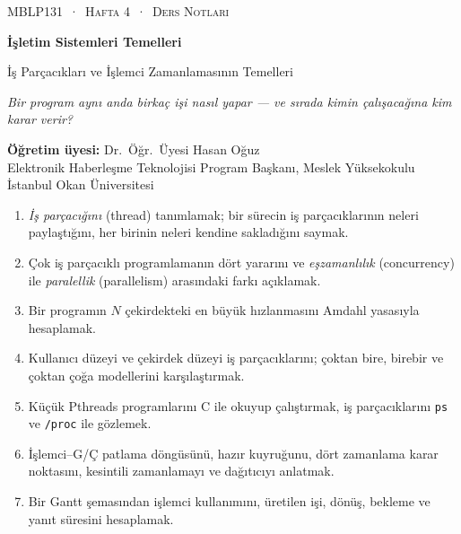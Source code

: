 \documentclass[11pt,a4paper]{article}
\newcommand{\cmd}[1]{\texttt{#1}}
\begin{document}
\thispagestyle{empty}
\begin{tcolorbox}[enhanced,colback=dark,colframe=dark,arc=0pt,boxrule=0pt,
  left=18pt,right=18pt,top=20pt,bottom=20pt,coltext=white]
{\small\color{mint}\textsc{MBLP131 \,·\, Hafta 4 \,·\, Ders Notları}}\par\medskip
{\headfont\fontsize{26}{30}\selectfont\bfseries İşletim Sistemleri Temelleri}\par\medskip
{\large İş Parçacıkları ve İşlemci Zamanlamasının Temelleri}\par\smallskip
{\small\itshape\color{white!70} Bir program aynı anda birkaç işi nasıl yapar --- ve sırada kimin çalışacağına kim karar verir?}
\end{tcolorbox}

\vspace{0.4em}
\begin{minipage}[t]{0.70\linewidth}
\small
\textbf{Öğretim üyesi:} Dr.\ Öğr.\ Üyesi Hasan Oğuz\\
Elektronik Haberleşme Teknolojisi Program Başkanı, Meslek Yüksekokulu\\
İstanbul Okan Üniversitesi
\end{minipage}

\vspace{0.8em}
\begin{keyidea}
\begin{enumerate}[leftmargin=1.4em]
  \item \emph{İş parçacığını} (thread) tanımlamak; bir sürecin iş parçacıklarının neleri paylaştığını, her birinin neleri kendine sakladığını saymak.
  \item Çok iş parçacıklı programlamanın dört yararını ve \emph{eşzamanlılık} (concurrency) ile \emph{paralellik} (parallelism) arasındaki farkı açıklamak.
  \item Bir programın $N$ çekirdekteki en büyük hızlanmasını Amdahl yasasıyla hesaplamak.
  \item Kullanıcı düzeyi ve çekirdek düzeyi iş parçacıklarını; çoktan bire, birebir ve çoktan çoğa modellerini karşılaştırmak.
  \item Küçük Pthreads programlarını C ile okuyup çalıştırmak, iş parçacıklarını \cmd{ps} ve \cmd{/proc} ile gözlemek.
  \item İşlemci--G/Ç patlama döngüsünü, hazır kuyruğunu, dört zamanlama karar noktasını, kesintili zamanlamayı ve dağıtıcıyı anlatmak.
  \item Bir Gantt şemasından işlemci kullanımını, üretilen işi, dönüş, bekleme ve yanıt süresini hesaplamak.
\end{enumerate}
\end{keyidea}
\end{document}
